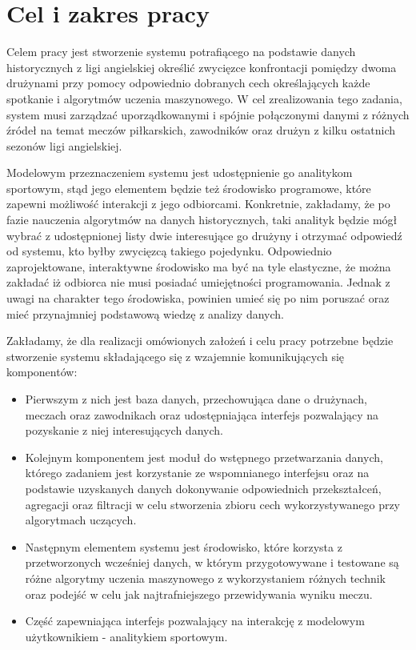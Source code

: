 \chapter{Cel i zakres pracy}

\noindent Celem pracy jest stworzenie systemu potrafiącego na podstawie danych historycznych z ligi angielskiej określić zwycięzce konfrontacji pomiędzy dwoma drużynami przy pomocy odpowiednio dobranych cech określających każde spotkanie i algorytmów uczenia maszynowego. W cel zrealizowania tego zadania, system musi zarządzać uporządkowanymi i spójnie połączonymi danymi z różnych źródeł na temat meczów piłkarskich, zawodników oraz drużyn z kilku ostatnich sezonów ligi angielskiej.

Modelowym przeznaczeniem systemu jest udostępnienie go analitykom sportowym, stąd jego elementem będzie też środowisko programowe, które zapewni możliwość interakcji z jego odbiorcami. Konkretnie, zakładamy, że po fazie nauczenia algorytmów na danych historycznych, taki analityk będzie mógł wybrać z udostępnionej listy dwie interesujące go drużyny i otrzymać odpowiedź od systemu, kto byłby zwycięzcą takiego pojedynku. Odpowiednio zaprojektowane, interaktywne środowisko ma być na tyle elastyczne, że można zakładać iż odbiorca nie musi posiadać umiejętności programowania. Jednak z uwagi na charakter tego środowiska, powinien umieć się po nim poruszać oraz mieć przynajmniej podstawową wiedzę z analizy danych.


Zakładamy, że dla realizacji omówionych założeń i celu pracy potrzebne będzie stworzenie systemu składającego się z wzajemnie komunikujących się komponentów: 
\begin{itemize}
    \item  Pierwszym z nich jest baza danych, przechowująca dane o drużynach, meczach oraz zawodnikach oraz udostępniająca interfejs pozwalający na pozyskanie z niej interesujących danych. 
    \item Kolejnym komponentem jest moduł do wstępnego przetwarzania danych, którego zadaniem jest korzystanie ze wspomnianego interfejsu oraz na podstawie uzyskanych danych dokonywanie odpowiednich przekształceń, agregacji oraz filtracji w celu stworzenia zbioru cech wykorzystywanego przy algorytmach uczących.
    \item Następnym elementem systemu jest środowisko, które korzysta z przetworzonych wcześniej danych, w którym przygotowywane i testowane są różne algorytmy uczenia maszynowego z wykorzystaniem różnych technik oraz podejść w celu jak najtrafniejszego przewidywania wyniku meczu.
    \item Część zapewniająca interfejs pozwalający na interakcję z modelowym użytkownikiem - analitykiem sportowym.
\end{itemize}

